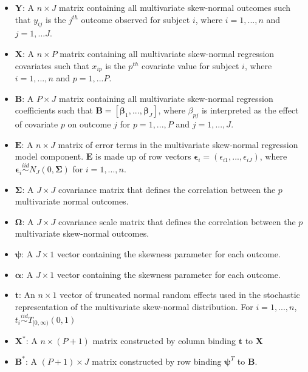 \documentclass[useAMS,referee]{biom}
\begin{document}
\begin{itemize}

    \item $\mathbf{Y}$: A $n \times J$ matrix containing all multivariate skew-normal  outcomes such that $y_{ij}$ is the $j^{th}$ outcome observed for subject $i$, where $i = 1,...,n$ and $j = 1,...J$.
    
    \item $\mathbf{X}$: A $n \times P$ matrix containing all multivariate skew-normal regression covariates such that $x_{ip}$ is the $p^{th}$ covariate value for subject $i$, where $i = 1,...,n$ and $p = 1,...P$.
    
    \item $\mathbf{B}$: A $P \times J$ matrix containing all multivariate skew-normal regression coefficients such that $\mathbf{B} = \left [ \boldsymbol\beta_1,...,\boldsymbol\beta_J \right ]$, where $\beta_{pj}$ is interpreted as the effect of covariate $p$ on outcome $j$ for $p = 1,...,P$ and $j = 1,...,J$.
    
    \item $\mathbf{E}$: A $n \times J$ matrix of error terms in the multivariate skew-normal regression model component. $\mathbf{E}$ is made up of row vectors $\boldsymbol\epsilon_i = (\epsilon_{i1},...,\epsilon_{iJ})$, where $ \boldsymbol\epsilon_i \stackrel{iid}{\sim} N_J(0, \boldsymbol\Sigma)$ for $i = 1,...,n$.
    
    \item $\boldsymbol\Sigma$: A $J \times J$ covariance matrix that defines the correlation between the $p$ multivariate normal outcomes. 
    
    \item $\boldsymbol\Omega$: A $J \times J$ covariance scale matrix that defines the correlation between the $p$ multivariate skew-normal outcomes. 
    
    \item $\boldsymbol\psi$: A $J \times 1$ vector containing the skewness parameter for each outcome.
    
    \item $\boldsymbol\alpha$: A $J \times 1$ vector containing the skewness parameter for each outcome.
    
    \item $\mathbf{t}$: An $n \times 1$ vector of truncated normal random effects used in the stochastic representation of the multivariate skew-normal distribution. For $i = 1,...,n$, $t_i \stackrel{iid}{\sim}T_{[0,\infty)}(0,1)$
    
    \item $\mathbf{X}^*$: A $n \times (P + 1)$ matrix constructed by column binding $\mathbf{t}$ to $\mathbf{X}$
    
    \item $\mathbf{B}^*$: A $(P+1) \times J$ matrix constructed by row binding $\boldsymbol\psi^T$ to $\mathbf{B}$.

\end{itemize}
\end{document}
